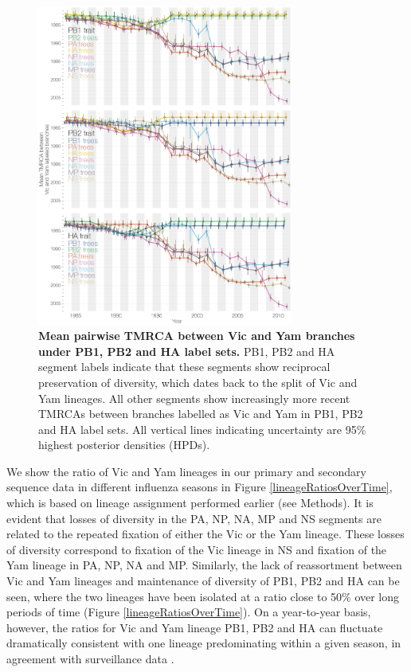 \documentclass[11pt,oneside,letterpaper]{article}
\begin{document}
\begin{figure}[h]
	\centering		
	\includegraphics[width=0.75\textwidth]{figures/InfB_betweenDiversity.png}
	\caption{\textbf{Mean pairwise TMRCA between Vic and Yam branches under PB1, PB2 and HA label sets.}
PB1, PB2 and HA segment labels indicate that these segments show reciprocal preservation of diversity, which dates back to the split of Vic and Yam lineages.
All other segments show increasingly more recent TMRCAs between branches labelled as Vic and Yam in PB1, PB2 and HA label sets.
All vertical lines indicating uncertainty are 95\% highest posterior densities (HPDs).}
	\label{betweenDiversity}
\end{figure}

We show the ratio of Vic and Yam lineages in our primary and secondary sequence data in different influenza seasons in Figure \ref{lineageRatiosOverTime}, which is based on lineage assignment performed earlier (see Methods).
It is evident that losses of diversity in the PA, NP, NA, MP and NS segments are related to the repeated fixation of either the Vic or the Yam lineage.
These losses of diversity correspond to fixation of the Vic lineage in NS and fixation of the Yam lineage in PA, NP, NA and MP.
Similarly, the lack of reassortment between Vic and Yam lineages and maintenance of diversity of PB1, PB2 and HA can be seen, where the two lineages have been isolated at a ratio close to 50\% over long periods of time (Figure \ref{lineageRatiosOverTime}).
On a year-to-year basis, however, the ratios for Vic and Yam lineage PB1, PB2 and HA can fluctuate dramatically consistent with one lineage predominating within a given season, in agreement with surveillance data \citep{reed2012}.
\end{document}

